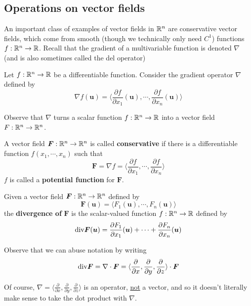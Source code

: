 \subsection{Operations on vector fields}

An important class of examples of vector fields in $\mathbb{R}^n$ are conservative vector fields, which come from smooth (though we technically only need $C^1$) functions $f: \mathbb{R}^n \to \mathbb{R}$.  Recall that the gradient of a multivariable function is denoted $\nabla$ (and is also sometimes called the del operator)

\begin{definition}
    Let $f: \mathbb{R}^n \to \mathbb{R}$ be a differentiable function.  Consider the gradient operator $\nabla$ defined by
    $$\nabla f (\bm{u}) = \langle \frac{\partial f}{\partial x_1}(\bm{u}), \cdots , \frac{\partial f}{\partial x_n}(\bm{u}) \rangle$$
    
    Observe that $\nabla$ turns a scalar function $f: \mathbb{R}^n \to \mathbb{R}$ into a vector field $F: \mathbb{R}^n \to \mathbb{R}^n$.
    \end{definition}

\begin{definition}
    A vector field $\bm{F} : \mathbb{R}^n \to \mathbb{R}^n$ is called \textbf{conservative} if there is a differentiable function $f(x_1,\cdots, x_n)$ such that $$\bm{F} = \nabla f = \langle \frac{\partial f}{\partial x_1}, \cdots , \frac{\partial f}{\partial x_n} \rangle$$
    $f$ is called a \textbf{potential function} for $\bm{F}$.
    \end{definition}








\begin{definition}
    Given a vector field $\bm{F} : \mathbb{R}^n \to \mathbb{R}^n$ defined by $$\bm{F}(\bm{u}) = \langle F_1(\bm{u}),\cdots, F_n(\bm{u}) \rangle$$ the \textbf{divergence of} $\bm{F}$ is the scalar-valued function $f : \mathbb{R}^n \to \mathbb{R}$ defined by     
    $$\textnormal{div} \bm{F}(\bm{u}) = \frac{\partial F_1}{\partial x_1}(\bm{u}) + \cdots + \frac{\partial F_n}{\partial x_n}(\bm{u})$$
    \end{definition}

Observe that we can abuse notation by writing $$\textnormal{div} \bm{F} = \nabla \cdot \bm{F} = \langle\frac{\partial}{\partial x}, \frac{\partial}{\partial y}, \frac{\partial}{\partial z}  \rangle \cdot \bm{F} $$
    
    Of course, $\nabla = \langle\frac{\partial}{\partial x}, \frac{\partial}{\partial y}, \frac{\partial}{\partial z}  \rangle$ is an operator, \underline{not} a vector, and so it doesn't literally make sense to take the dot product with $\nabla$. 


